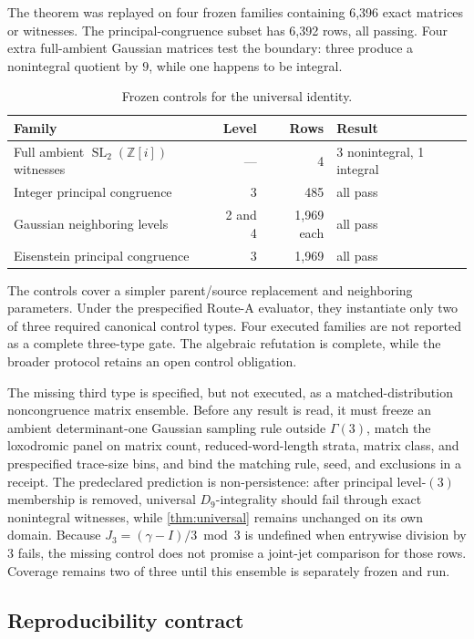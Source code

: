 \documentclass[11pt,a4paper]{article}
\theoremstyle{definition}
\theoremstyle{remark}
\newcommand{\SL}{\operatorname{SL}}
\newcommand{\Gauss}{\mathbb{Z}[i]}
\begin{document}
The theorem was replayed on four frozen families containing 6,396 exact matrices or witnesses. The principal-congruence subset has 6,392 rows, all passing. Four extra full-ambient Gaussian matrices test the boundary: three produce a nonintegral quotient by \(9\), while one happens to be integral.

\begin{table}[t]
\centering
\caption{Frozen controls for the universal identity.}
\label{tab:controls}
\begin{tabular}{lrrl}
\toprule
Family & Level & Rows & Result \\
\midrule
Full ambient \(\SL_2(\Gauss)\) witnesses & --- & 4 & 3 nonintegral, 1 integral \\
Integer principal congruence & 3 & 485 & all pass \\
Gaussian neighboring levels & 2 and 4 & 1,969 each & all pass \\
Eisenstein principal congruence & 3 & 1,969 & all pass \\
\bottomrule
\end{tabular}
\end{table}

The controls cover a simpler parent/source replacement and neighboring parameters. Under the prespecified Route-A evaluator, they instantiate only two of three required canonical control types. Four executed families are not reported as a complete three-type gate. The algebraic refutation is complete, while the broader protocol retains an open control obligation.

The missing third type is specified, but not executed, as a matched-distribution noncongruence matrix ensemble. Before any result is read, it must freeze an ambient determinant-one Gaussian sampling rule outside \(\Gamma(3)\), match the loxodromic panel on matrix count, reduced-word-length strata, matrix class, and prespecified trace-size bins, and bind the matching rule, seed, and exclusions in a receipt. The predeclared prediction is non-persistence: after principal level-\((3)\) membership is removed, universal \(D_9\)-integrality should fail through exact nonintegral witnesses, while \cref{thm:universal} remains unchanged on its own domain. Because \(J_3=(\gamma-I)/3\bmod3\) is undefined when entrywise division by \(3\) fails, the missing control does not promise a joint-jet comparison for those rows. Coverage remains two of three until this ensemble is separately frozen and run.

\subsection{Reproducibility contract}
\end{document}
